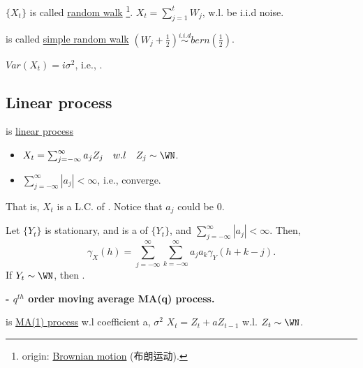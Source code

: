 \begin{definition}
$\{X_t\}$ is called \uline{random walk}
\footnote{origin: \href{https://en.wikipedia.org/wiki/Brownian_motion}{Brownian motion} (布朗运动).}.
\iff $X_t = \sum_{j=1}^{t} W_j$, w.l.  be i.i.d noise. 
\end{definition}

\begin{definition}
 is called \uline{simple random walk} \iff $(W_j + \frac{1}{2}) \overset{i.i.d}{\sim} bern(\frac{1}{2})$.
\end{definition}

\begin{property}
$Var(X_t) = i \sigma^2$, i.e., .
\end{property}

\subsection{Linear process}
\begin{definition}
 is \uline{linear process} \iff 
\begin{itemize}
    \item $X_t = \sum_{j = -\infty}^{\infty} a_j Z_j \quad w.l \quad Z_j \sim \WN$. 
    \item $\sum_{j= -\infty}^{\infty}|a_j|<\infty$, i.e., converge.
\end{itemize}

That is, $X_t$ is a L.C. of . Notice that $a_j$ could be 0.
\end{definition}

\begin{property}
Let $\{Y_t\}$ is stationary, and  is a  of $\{Y_t\}$, and $\sum_{j = -\infty}^{\infty}|a_j|<\infty$. Then,
\[
    \gamma_X(h) = \sum_{j = -\infty}^{\infty}\sum_{k = -\infty}^{\infty} a_j a_k \gamma_Y(h+k-j).
\]
If $Y_t \sim \WN$, then . 
\end{property}

\noindent \textbf{- $q^{th}$ order moving average MA(q) process.}

\begin{definition}
 is \uline{MA(1) process} w.l coefficient a, $\sigma^2$ \iff $X_t = Z_t + a Z_{t-1}$ w.l. $Z_t \sim \WN$.
\end{definition}

